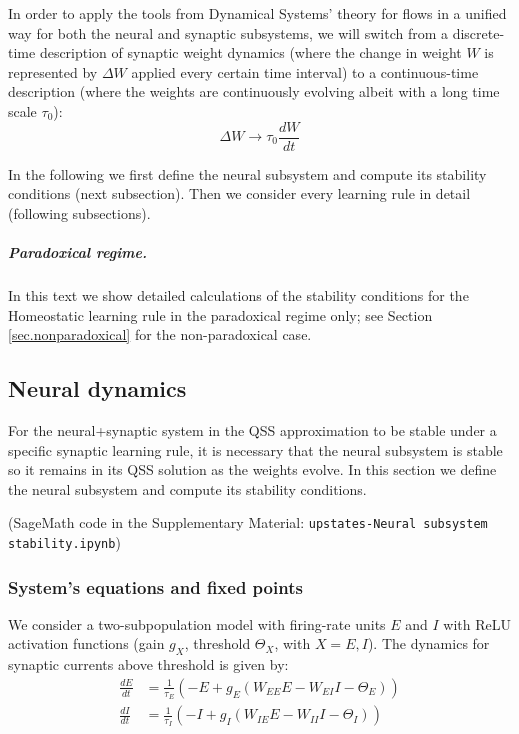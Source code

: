 \documentclass[twocolumn]{article}
\newcommand{\EE}{\mathit{EE}}
\newcommand{\EI}{\mathit{EI}}
\newcommand{\IE}{\mathit{IE}}
\newcommand{\II}{\mathit{II}}
\begin{document}
In order to apply the tools from Dynamical Systems' theory for flows in a unified way for both the neural and synaptic subsystems, we will switch from a discrete-time description of synaptic weight dynamics (where the change in weight $W$ is represented by $\Delta W$ applied every certain time interval) to a continuous-time description (where the weights are continuously evolving albeit with a long time scale $\tau_0$):
\begin{displaymath}
\Delta W \rightarrow \tau_0 \frac{dW}{dt}
\end{displaymath}

In the following we first define the neural subsystem and compute its stability conditions (next subsection). Then we consider every learning rule in detail (following subsections).

\subparagraph{Paradoxical regime.} In this text we show detailed calculations of the stability conditions for the Homeostatic learning rule in the paradoxical regime only; see Section \ref{sec.nonparadoxical} for the non-paradoxical case.



\subsection{Neural dynamics}
\label{sec.neural}

For the neural+synaptic system in the QSS approximation to be stable under a specific synaptic learning rule, it is necessary that the neural subsystem is stable so it remains in its QSS solution as the weights evolve. In this section we define the neural subsystem and compute its stability conditions.

(SageMath code in the Supplementary Material: {\tt upstates-Neural subsystem stability.ipynb})


\subsubsection{System's equations and fixed points}

We consider a two-subpopulation model with firing-rate units $E$ and $I$ with ReLU activation functions (gain $g_X$, threshold $\Theta_X$, with $X=E,I$). The dynamics for synaptic currents above threshold is given by:
\begin{equation}
\begin{aligned}
\frac{dE}{dt} & = \frac{1}{\tau_E}(-E + g_E(W_{\EE}E - W_{\EI}I - \Theta_E)) \\
\frac{dI}{dt} & = \frac{1}{\tau_I}(-I + g_I(W_{\IE}E - W_{\II}I - \Theta_I))
\end{aligned}
\label{eq.neural}
\end{equation}
\end{document}

